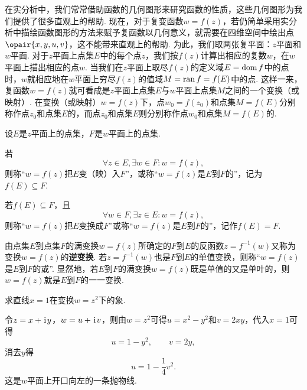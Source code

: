 在实分析中，我们常常借助函数的几何图形来研究函数的性质，这些几何图形为我们提供了很多直观上的帮助.
现在，对于复变函数\(w = f(z)\)，若仍简单采用实分析中描绘函数图形的方法来赋予复函数以几何意义，就需要在四维空间中绘出点\(\opair{x,y,u,v}\)，这不能带来直观上的帮助.
为此，我们取两张复平面：\(z\)平面和\(w\)平面.
对于\(z\)平面上点集\(E\)中的每个点\(z\)，我们按\(f(z)\)计算出相应的复数\(w\)，在\(w\)平面上描出相应的点\(w\).
当我们在\(z\)平面上取尽\(f(z)\)的定义域\(E = \operatorname{dom} f\)中的点时，\(w\)就相应地在\(w\)平面上穷尽\(f(z)\)的值域\(M = \operatorname{ran} f = f(E)\)中的点.
这样一来，复函数\(w = f(z)\)就可看成是\(z\)平面上点集\(E\)与\(w\)平面上点集\(M\)之间的一个变换（或映射）.
在变换（或映射）\(w=f(z)\)下，点\(w_0=f(z_0)\)和点集\(M=f(E)\)分别称作点\(z_0\)和点集\(E\)的，而点\(z_0\)和点集\(E\)则分别称作点\(w_0\)和点集\(M=f(E)\)的.

\begin{definition}
设\(E\)是\(z\)平面上的点集，\(F\)是\(w\)平面上的点集.

若\[
\forall z \in E, \exists w \in F : w = f(z),
\]则称“\(w=f(z)\)把\(E\)变（映）入\(F\)”，或称“\(w=f(z)\)是\(E\)到\(F\)的”，记为\(f(E) \subseteq F\).

若\(f(E) \subseteq F\)，且\[
\forall w \in F, \exists z \in E : w = f(z),
\]则称“\(w = f(z)\)把\(E\)变换成\(F\)”或称“\(w = f(z)\)是\(E\)到\(F\)的”，记作\(f(E) = F\).

由点集\(E\)到点集\(F\)的满变换\(w = f(z)\)所确定的\(F\)到\(E\)的反函数\(z=f^{-1}(w)\)又称为变换\(w = f(z)\)的\textbf{逆变换}.
若\(z=f^{-1}(w)\)也是\(F\)到\(E\)的单值变换，则称“\(w = f(z)\)是\(E\)到\(F\)的或”.
显然地，若\(E\)到\(F\)的满变换\(w = f(z)\)既是单值的又是单叶的，则\(w = f(z)\)就是\(E\)到\(F\)的一一变换.
\end{definition}

\begin{example}
求直线\(x=1\)在变换\(w=z^2\)下的象.
\begin{solution}
令\(z=x+\kern1pt\mathrm{i}\kern1pt y\)，\(w=u+\kern1pt\mathrm{i}\kern1pt v\)，则由\(w=z^2\)可得\(u=x^2-y^2\)和\(v=2xy\)，代入\(x=1\)可得\[
u=1-y^2, \qquad v=2y,
\]消去\(y\)得\[
u=1-\frac{1}{4} v^2.
\]这是\(w\)平面上开口向左的一条抛物线.
\end{solution}
\end{example}

